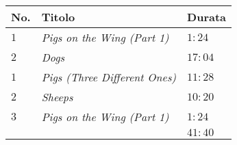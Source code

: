 \documentclass{standalone}
\begin{document}
    \begin{tabular}{l l l}
        \toprule
        \textbf{No.} & \textbf{Titolo} & \textbf{Durata} \\
        \midrule
        \(1\)            & \emph{Pigs on the Wing (Part 1)}     & \(1:24\) \\
        \(2\)       & \emph{Dogs}   & \(17:04\) \\
        \midrule
        \(1\)   & \emph{Pigs (Three Different Ones)}    & \(11:28\)\\ 
        \(2\) & \emph{Sheeps}     & \(10:20\)\\
        \(3\)    & \emph{Pigs on the Wing (Part 1)}    & \(1:24\) \\
        \midrule
        {} & {} & \(41:40\) \\
        \bottomrule
    \end{tabular}
\end{document}
